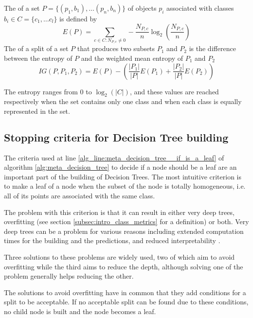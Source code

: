\begin{definition}
    The  of a set $P = \{(p_1, b_1),\allowbreak\dots (p_n, b_n)\}$ of objects $p_i$ associated with classes $b_i \in C = \{c_1, \dots c_l\}$ is defined by
    \begin{equation}
        E(P) = \sum_{c \in C : N_{P, c} \neq 0} -\frac{N_{P, c}}{n} \log_2 \left( \frac{N_{P, c}}{n} \right)
    \end{equation}
    The  of a split of a set $P$ that produces two subsets $P_1$ and $P_2$ is the difference between the entropy of $P$ and the weighted mean entropy of $P_1$ and $P_2$
    \begin{equation}
        IG(P, P_1, P_2) = E(P) - \left(\frac{|P_1|}{|P|} E(P_1) + \frac{|P_2|}{|P|} E(P_2)\right)
    \end{equation}
\end{definition}
The entropy ranges from 0 to $\log_2(|C|)$, and these values are reached respectively when the set contains only one class and when each class is equally represented in the set.

\subsection{Stopping criteria for Decision Tree building}
The criteria used at line \ref{alg_line:meta_decision_tree__if_is_a_leaf} of algorithm \ref{alg:meta_decision_tree} to decide if a node should be a leaf are an important part of the building of Decision Trees. The most intuitive criterion is to make a leaf of a node when the subset of the node is totally homogeneous, i.e. all of its points are associated with the same class.

The problem with this criterion is that it can result in either very deep trees, overfitting (see section \ref{subsec:intro_class_metrics} for a definition) or both. Very deep trees can be a problem for various reasons including extended computation times for the building and the predictions, and reduced interpretability . 

Three solutions to these problems are widely used, two of which aim to avoid overfitting while the third aims to reduce the depth, although solving one of the problem generally helps reducing the other.

The solutions to avoid overfitting have in common that they add conditions for a split to be acceptable. If no acceptable split can be found due to these conditions, no child node is built and the node becomes a leaf.

